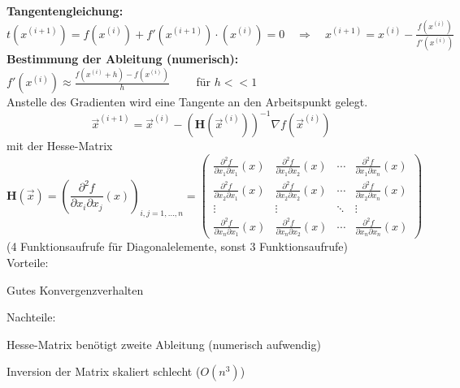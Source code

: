   \begin{minipage}{13cm}
  	\textbf{Tangentengleichung:}\\
  	$t(x^{(i+1)})=f(x^{(i)})+f'(x^{(i+1)})\cdot(x^{(i)})=0\quad\Rightarrow\quad x^{(i+1)}=x^{(i)}-\frac{f(x^{(i)})}{f'(x^{(i)})}$\\
  	
  	\textbf{Bestimmung der Ableitung (numerisch):}\\
  	$f'(x^{(i)})\approx\frac{f(x^{(i)}+h)-f(x^{(i)})}{h}\qquad$ für $h<<1$\\
  	
    Anstelle des Gradienten wird eine Tangente an den Arbeitspunkt gelegt.
    $$\vec{x}^{(i+1)} = \vec{x}^{(i)} - \left(\bm H(\vec{x}^{(i)})\right)^{-1} \nabla f(\vec{x}^{(i)})$$
    mit der Hesse-Matrix
    $$\bm{H}(\vec{x})=
    \left(\frac{\partial^2f}{\partial x_i\partial x_j}(x)\right)_{i,j=1,\dots, n}=
    \begin{pmatrix}
    \frac{\partial^2 f}{\partial x_1\partial x_1}(x)&\frac{\partial^2 f}{\partial x_1\partial x_2}(x)&\cdots&\frac{\partial^2  f}{\partial x_1\partial x_n}(x)\\[0.5em]
    \frac{\partial^2 f}{\partial x_2\partial x_1}(x)&\frac{\partial^2 f}{\partial x_2\partial x_2}(x)&\cdots&\frac{\partial^2  f}{\partial x_2\partial x_n}(x)\\
    \vdots&\vdots&\ddots&\vdots\\
    \frac{\partial^2 f}{\partial x_n\partial x_1}(x)&\frac{\partial^2 f}{\partial x_n\partial x_2}(x)&\cdots&\frac{\partial^2  f}{\partial x_n\partial x_n}(x)
    \end{pmatrix}$$
    (4 Funktionsaufrufe für Diagonalelemente, sonst 3 Funktionsaufrufe)\\
    
    Vorteile:
    \begin{liste}
      \item Gutes Konvergenzverhalten
    \end{liste}
    
    Nachteile:
    \begin{liste}
      \item Hesse-Matrix benötigt zweite Ableitung (numerisch aufwendig)
      \item Inversion der Matrix skaliert schlecht ($O(n^3)$)
    \end{liste}
  \end{minipage}
